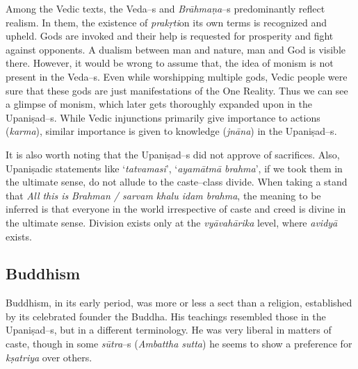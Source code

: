 Among the Vedic texts, the Veda–s and \textit{Brāhmaṇa}–s predominantly reflect realism. In them, the existence of \textit{prakṛti}on its own terms is recognized and upheld. Gods are invoked and their help is requested for prosperity and fight against opponents. A dualism between man and nature, man and God is visible there. However, it would be wrong to assume that, the idea of monism is not present in the Veda–s. Even while worshipping multiple gods, Vedic people were sure that these gods are just manifestations of the One Reality. Thus we can see a glimpse of monism, which later gets thoroughly expanded upon in the Upaniṣad–s. While Vedic injunctions primarily give importance to actions (\textit{karma}), similar importance is given to knowledge (\textit{jnāna}) in the Upaniṣad–s.

It is also worth noting that the Upaniṣad–s did not approve of sacrifices. Also, Upaniṣadic statements like ‘\textit{tatvamasi}’, ‘\textit{ayamātmā brahma}’, if we took them in the ultimate sense, do not allude to the caste–class divide. When taking a stand that \textit{All this is} \textit{Brahman / sarvam khalu idam brahma}, the meaning to be inferred is that everyone in the world irrespective of caste and creed is divine in the ultimate sense. Division exists only at the \textit{vyāvahārika} level, where \textit{avidyā} exists.


\subsection*{Buddhism}

Buddhism, in its early period, was more or less a sect than a religion, established by its celebrated founder the Buddha. His teachings resembled those in the Upaniṣad–s, but in a different terminology. He was very liberal in matters of caste, though in some \textit{sūtra}–s (\textit{Ambattha sutta}) he seems to show a preference for \textit{kṣatriya} over others.

